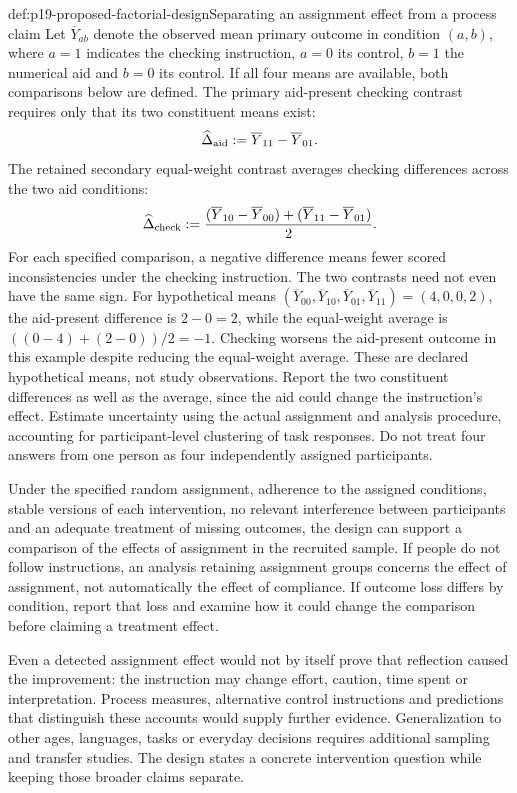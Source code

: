 \begin{hbexample}{def:p19-proposed-factorial-design}{Separating an assignment effect from a process claim}
Let \(\overline Y_{ab}\) denote the observed mean primary outcome in condition
\((a,b)\), where \(a=1\) indicates the checking instruction, \(a=0\) its
control, \(b=1\) the numerical aid and \(b=0\) its control. If all four means
are available, both comparisons below are defined. The primary aid-present
checking contrast requires only that its two constituent means exist:
\[
 \widehat\Delta_{\rm aid}\mathrel{:=}\overline Y_{11}-\overline Y_{01}.
\]
The retained secondary equal-weight contrast averages checking differences
across the two aid conditions:
\[
 \widehat\Delta_{\rm check}\mathrel{:=}
 \frac{(\overline Y_{10}-\overline Y_{00})+
       (\overline Y_{11}-\overline Y_{01})}{2}.
\]
For each specified comparison, a negative difference means fewer scored
inconsistencies under the checking instruction. The two contrasts need not
even have the same sign. For hypothetical means
\((\overline Y_{00},\overline Y_{10},\overline Y_{01},\overline Y_{11})
=(4,0,0,2)\), the aid-present difference is \(2-0=2\), while the
equal-weight average is \(((0-4)+(2-0))/2=-1\). Checking worsens the
aid-present outcome in this example despite reducing the equal-weight average.
These are declared hypothetical means, not study observations. Report the
two constituent differences as well as the average, since the aid could change
the instruction's effect. Estimate uncertainty using the actual assignment and
analysis procedure, accounting for participant-level clustering of task
responses. Do not treat four answers from one person as four independently
assigned participants.

Under the specified random assignment, adherence to the assigned conditions,
stable versions of each intervention, no relevant interference between
participants and an adequate treatment of missing outcomes, the design can
support a comparison of the effects of assignment in the recruited sample.
If people do not follow instructions, an analysis retaining assignment groups
concerns the effect of assignment, not automatically the effect of compliance.
If outcome loss differs by condition, report that loss and examine how it could
change the comparison before claiming a treatment effect.

Even a detected assignment effect would not by itself prove that reflection
caused the improvement: the instruction may change effort, caution, time spent
or interpretation. Process measures, alternative control instructions and
predictions that distinguish these accounts would supply further evidence.
Generalization to other ages, languages, tasks or everyday decisions requires
additional sampling and transfer studies. The design states a concrete
intervention question while keeping those broader claims separate.
\end{hbexample}

